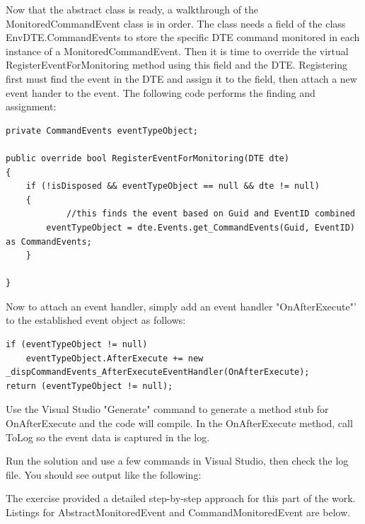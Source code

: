 \begin{Exercise}
Now that the abstract class is ready, a walkthrough of the MonitoredCommandEvent class is in order.  The class needs a field of the class EnvDTE.CommandEvents to store the specific DTE command monitored in each instance of a MonitoredCommandEvent.  Then it is time to override the virtual RegisterEventForMonitoring method using this field and the DTE.  Registering first must find the event in the DTE and assign it to the field, then attach a new event hander to the event.  The following code performs the finding and assignment:

\begin{lstlisting}
private CommandEvents eventTypeObject;

public override bool RegisterEventForMonitoring(DTE dte)
{
    if (!isDisposed && eventTypeObject == null && dte != null)
    {
    		//this finds the event based on Guid and EventID combined
        eventTypeObject = dte.Events.get_CommandEvents(Guid, EventID) as CommandEvents;
    }
		
}
\end{lstlisting}

Now to attach an event handler, simply add an event handler "OnAfterExecute"' to the established event object as follows:
\begin{lstlisting}
if (eventTypeObject != null) 
	eventTypeObject.AfterExecute += new _dispCommandEvents_AfterExecuteEventHandler(OnAfterExecute);
return (eventTypeObject != null);
\end{lstlisting}              

Use the Visual Studio "Generate" command to generate a method stub for OnAfterExecute and the
code will compile.  In the OnAfterExecute method, call ToLog so the event data is captured in the log.

Run the solution and use a few commands in Visual Studio, then check the log file.  You should see output like the following:


\end{Exercise}

\begin{Answer}
The exercise provided a detailed step-by-step approach for this part of the work.  Listings for AbstractMonitoredEvent and CommandMonitoredEvent are below.

%

%

\end{Answer}

